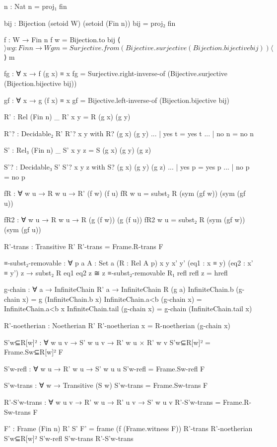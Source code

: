 \begin{spverbatim}
  n : Nat
  n = proj₁ fin

  bij : Bijection (setoid W) (setoid (Fin n))
  bij = proj₂ fin

  f : W → Fin n
  f w = Bijection.to bij ⟨$⟩ w

  g : Fin n → W
  g m = Surjective.from (Bijective.surjective (Bijection.bijective bij)) ⟨$⟩ m

  fg : ∀ x → f (g x) ≡ x
  fg = Surjective.right-inverse-of (Bijective.surjective (Bijection.bijective bij))

  gf : ∀ x → g (f x) ≡ x
  gf = Bijective.left-inverse-of (Bijection.bijective bij)

  R' : Rel (Fin n) _
  R' x y = R (g x) (g y)

  R'? : Decidable₂ R'
  R'? x y with R? (g x) (g y)
  ... | yes t = yes t
  ... | no n = no n

  S' : Rel₃ (Fin n) _
  S' x y z = S (g x) (g y) (g z)

  S'? : Decidable₃ S'
  S'? x y z with S? (g x) (g y) (g z)
  ... | yes p = yes p
  ... | no p = no p

  fR : ∀ {w u} → R w u → R' (f w) (f u)
  fR {w} {u} = subst₂ R (sym (gf w)) (sym (gf u))

  fR2 : ∀ {w u} → R w u → R (g (f w)) (g (f u))
  fR2 {w} {u} = subst₂ R (sym (gf w)) (sym (gf u))

  R'-trans : Transitive R'
  R'-trans = Frame.R-trans F

  ≡-subst₂-removable : ∀ {p a} {A : Set a} (R : Rel A p) {x y x' y'}
    (eq1 : x ≡ y) (eq2 : x' ≡ y') z → subst₂ R eq1 eq2 z ≅ z
  ≡-subst₂-removable R₁ refl refl z = hrefl

  g-chain : ∀ {a} → InfiniteChain R' a → InfiniteChain R (g a)
  InfiniteChain.b (g-chain x) = g (InfiniteChain.b x)
  InfiniteChain.a<b (g-chain x) = InfiniteChain.a<b x
  InfiniteChain.tail (g-chain x) = g-chain (InfiniteChain.tail x)

  R'-noetherian : Noetherian R'
  R'-noetherian x = R-noetherian (g-chain x)

  S'w⊆R[w]² : ∀ {w u v} → S' w u v → R' w u × R' w v
  S'w⊆R[w]² = Frame.Sw⊆R[w]² F

  S'w-refl : ∀ {w u} → R' w u → S' w u u
  S'w-refl = Frame.Sw-refl F

  S'w-trans : ∀ {w} → Transitive (S w)
  S'w-trans = Frame.Sw-trans F

  R'-S'w-trans : ∀ {w u v} → R' w u → R' u v → S' w u v
  R'-S'w-trans = Frame.R-Sw-trans F

  F' : Frame (Fin n) R' S'
  F' = frame (f (Frame.witness F)) R'-trans R'-noetherian S'w⊆R[w]²
      S'w-refl S'w-trans R'-S'w-trans


\end{spverbatim}
